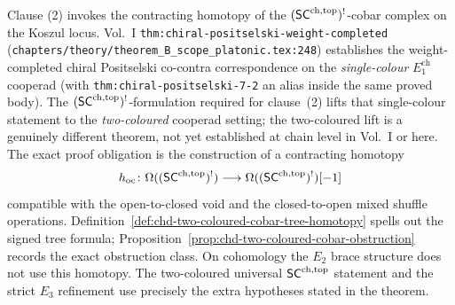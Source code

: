 \begin{remark}%
\label{rem:chd-universality-hypotheses}%
\label{rem:chd-universality-conditional}%
%
Clause (2) invokes the contracting homotopy of the $(\mathsf{SC}^{\mathrm{ch},\mathrm{top}})^!$-cobar
complex on the Koszul locus. Vol.~I
\texttt{thm:chiral-positselski-weight-completed}
(\texttt{chapters/theory/theorem\_B\_scope\_platonic.tex:248}) establishes
the weight-completed chiral Positselski co-contra correspondence on the
\emph{single-colour} $E_1^{\mathrm{ch}}$ cooperad (with
\texttt{thm:chiral-positselski-7-2} an alias inside the same proved body).
The
$(\mathsf{SC}^{\mathrm{ch},\mathrm{top}})^!$-formulation required for clause~(2) lifts that
single-colour statement to the \emph{two-coloured} cooperad setting;
the two-coloured lift is a genuinely different theorem, not yet
established at chain level in Vol.~I or here. The exact proof
obligation is the construction of a contracting homotopy
\[
 h_{\mathrm{oc}}\colon
 \Omega((\mathsf{SC}^{\mathrm{ch},\mathrm{top}})^!) \longrightarrow \Omega((\mathsf{SC}^{\mathrm{ch},\mathrm{top}})^!)[-1]
\]
compatible with the open-to-closed void and the closed-to-open mixed
shuffle operations. Definition~\ref{def:chd-two-coloured-cobar-tree-homotopy}
spells out the signed tree formula; Proposition~\ref{prop:chd-two-coloured-cobar-obstruction}
records the exact obstruction class. On cohomology the $E_2$ brace
structure does not use this homotopy. The two-coloured universal
$\mathsf{SC}^{\mathrm{ch},\mathrm{top}}$ statement and the strict $E_3$ refinement use precisely the
extra hypotheses stated in the theorem.
\end{remark}

